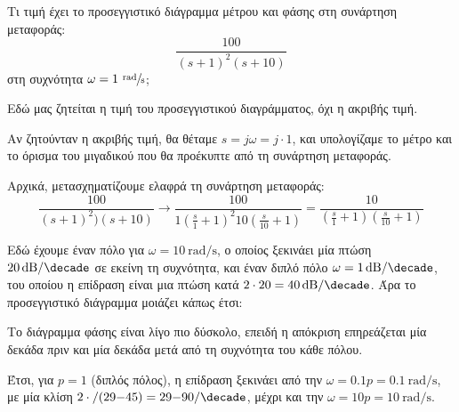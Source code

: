 \documentclass[11pt,a4paper,notitlepage,fleqn,final]{article}
\begin{document}
\begin{exercise}
Τι τιμή έχει το προσεγγιστικό διάγραμμα μέτρου και φάσης στη συνάρτηση μεταφοράς:
\[ \displaystyle \frac{100}{(s+1)^2(s+10)} \] στη συχνότητα \( \omega = 1\ \sfrac{\mathrm{rad}}{\mathrm{s}} \);
\tcblower
\begin{attnbox}{}
	Εδώ μας ζητείται η τιμή του προσεγγιστικού διαγράμματος, όχι η ακριβής τιμή.
\end{attnbox}
Αν ζητούνταν η ακριβής τιμή, θα θέταμε \( s=j\omega = j\cdot 1 \), και υπολογίζαμε το
μέτρο και το όρισμα του μιγαδικού που θα προέκυπτε από τη συνάρτηση μεταφοράς.

Αρχικά, μετασχηματίζουμε ελαφρά τη συνάρτηση μεταφοράς:
\[
\frac{100}{(s+1)^2)(s+10)}
\xrightarrow{\quad}
\frac{100}{1\left(\frac{s}{1}+1\right)^2 10 \left(\frac{s}{10}+1\right)}
= \frac{10}{\left(\frac{s}{1}+1\right)\left(\frac{s}{10}+1\right)}
\]

Εδώ έχουμε έναν πόλο για \( \omega  = \SI{10}{\radian/\second} \), ο οποίος ξεκινάει μία
πτώση \( \SI{20}{\decibel/\decade} \) σε εκείνη τη συχνότητα, και έναν διπλό πόλο
\( \omega  = \SI{1}{\decibel/\decade} \), του οποίου η επίδραση είναι μια πτώση κατά
\( 2\cdot20 = \SI{40}{\decibel/\decade} \). Άρα το προσεγγιστικό διάγραμμα μοιάζει κάπως έτσι:


Το διάγραμμα φάσης είναι λίγο πιο δύσκολο, επειδή η απόκριση επηρεάζεται μία δεκάδα πριν
και μία δεκάδα μετά από τη συχνότητα του κάθε πόλου.

Έτσι, για \( p=1 \) (διπλός πόλος), η επίδραση ξεκινάει από την \( \omega = 0.1p =
\SI{0.1}{\radian/\second}  \), με μία κλίση \( 2\cdot/(\ang{-45}) = \ang{-90}/\si{\decade} \),
μέχρι και την \( \omega = 10p = \SI{10}{\radian/\second} \).


\end{exercise}
\end{document}
